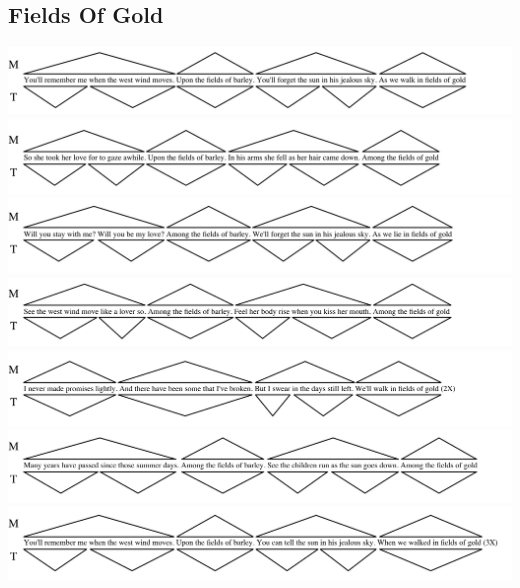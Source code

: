 \subsection*{Fields Of Gold}

\includegraphics[width=\textwidth]{resources/trees/fog-s1.png}
\includegraphics[width=\textwidth]{resources/trees/fog-s2.png}
\includegraphics[width=\textwidth]{resources/trees/fog-s3.png}
\includegraphics[width=\textwidth]{resources/trees/fog-s4.png}
\includegraphics[width=\textwidth]{resources/trees/fog-br.png}
\includegraphics[width=\textwidth]{resources/trees/fog-s5.png}
\includegraphics[width=\textwidth]{resources/trees/fog-s6.png}







